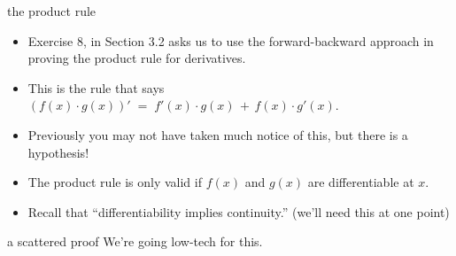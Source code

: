 \documentclass[landscape]{beamer}
\begin{document}
\begin{frame}{the product rule}
\begin{itemize}
\item Exercise 8, in Section 3.2 asks us to use the forward-backward approach in proving the product rule for derivatives.\pause
\item This is the rule that says $(f(x)\cdot g(x))' \; = \; f'(x)\cdot g(x) \, + \, f(x)\cdot g'(x)$. \pause
\item Previously you may not have taken much notice of this, but there is a hypothesis! \pause
\item The product rule is only valid if $f(x)$ and $g(x)$ are differentiable at $x$. \pause 
\item Recall that ``differentiability implies continuity.'' \pause (we'll need this at one point)
\end{itemize}
\end{frame}

\begin{frame}{a scattered proof}
We're going low-tech for this.
\end{frame}
\end{document}
